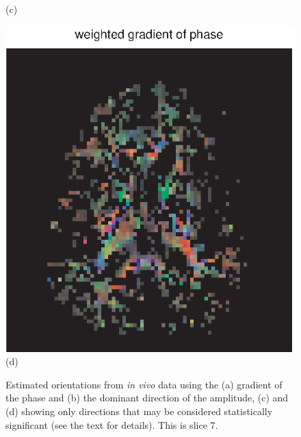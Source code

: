\documentclass[authoryear,preprint,12pt]{elsarticle}
\begin{document}
\begin{figure}[p]
\begin{center}
\begin{minipage}[]{.42\textwidth}
         (c)
      \end{minipage}
        \begin{minipage}[]{.42\textwidth}
      \centering
      \includegraphics[width=\textwidth]{gradphase55d.eps}
      (d)
    \end{minipage}
  \end{center}
  \caption{Estimated orientations from {\em in vivo} data using the
    (a) gradient of the phase and (b) the dominant direction of the
    amplitude, (c) and (d) showing only directions that may be
    considered statistically significant (see the text for
    details). This is slice 7.}
  \label{fig1b} 
\end{figure}
\end{document}
